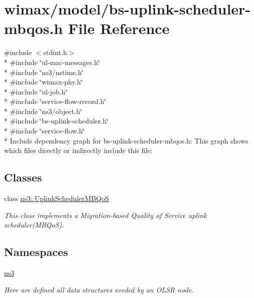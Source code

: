\hypertarget{bs-uplink-scheduler-mbqos_8h}{}\section{wimax/model/bs-\/uplink-\/scheduler-\/mbqos.h File Reference}
\label{bs-uplink-scheduler-mbqos_8h}
{\ttfamily \#include $<$stdint.\+h$>$}\\*
{\ttfamily \#include \char`\"{}ul-\/mac-\/messages.\+h\char`\"{}}\\*
{\ttfamily \#include \char`\"{}ns3/nstime.\+h\char`\"{}}\\*
{\ttfamily \#include \char`\"{}wimax-\/phy.\+h\char`\"{}}\\*
{\ttfamily \#include \char`\"{}ul-\/job.\+h\char`\"{}}\\*
{\ttfamily \#include \char`\"{}service-\/flow-\/record.\+h\char`\"{}}\\*
{\ttfamily \#include \char`\"{}ns3/object.\+h\char`\"{}}\\*
{\ttfamily \#include \char`\"{}bs-\/uplink-\/scheduler.\+h\char`\"{}}\\*
{\ttfamily \#include \char`\"{}service-\/flow.\+h\char`\"{}}\\*
Include dependency graph for bs-\/uplink-\/scheduler-\/mbqos.h\+:
This graph shows which files directly or indirectly include this file\+:
\subsection*{Classes}
\begin{DoxyCompactItemize}
\item 
class \hyperlink{classns3_1_1UplinkSchedulerMBQoS}{ns3\+::\+Uplink\+Scheduler\+M\+B\+QoS}
\begin{DoxyCompactList}\small\item\em This class implements a Migration-\/based Quality of Service uplink scheduler(\+M\+B\+Qo\+S). \end{DoxyCompactList}\end{DoxyCompactItemize}
\subsection*{Namespaces}
\begin{DoxyCompactItemize}
\item 
 \hyperlink{namespacens3}{ns3}
\begin{DoxyCompactList}\small\item\em Here are defined all data structures needed by an O\+L\+SR node. \end{DoxyCompactList}\end{DoxyCompactItemize}
